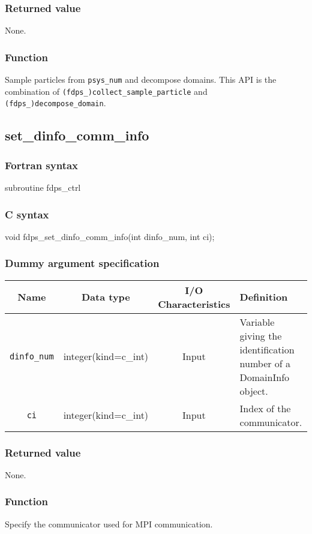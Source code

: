 \subsubsection*{Returned value}
None.

\subsubsection*{Function}
Sample particles from \texttt{psys\_num} and decompose domains. This API is the combination of {\tt (fdps\_)collect\_sample\_particle} and {\tt (fdps\_)decompose\_domain}.


\subsection{set\_dinfo\_comm\_info}
\subsubsection*{Fortran syntax}
\begin{screen}
\begin{spverbatim}
subroutine fdps_ctrl%
\end{spverbatim}
\end{screen}

\subsubsection*{C syntax}
\begin{screen}
\begin{spverbatim}
void fdps_set_dinfo_comm_info(int dinfo_num,
                                   int ci);
\end{spverbatim}
\end{screen}



\subsubsection*{Dummy argument specification}
\begin{table}[h]
\begin{tabularx}{\linewidth}{cccX}
\toprule
\rowcolor{Snow2}
Name & Data type & I/O Characteristics & Definition \\
\midrule
\texttt{dinfo\_num} & integer(kind=c\_int) & Input &  Variable giving the identification number of a DomainInfo object.\\
\texttt{ci} & integer(kind=c\_int) & Input & Index of the communicator.\\
\bottomrule
\end{tabularx}
\end{table}

\subsubsection*{Returned value}
None.

\subsubsection*{Function}

Specify the communicator used for MPI communication.

\clearpage
